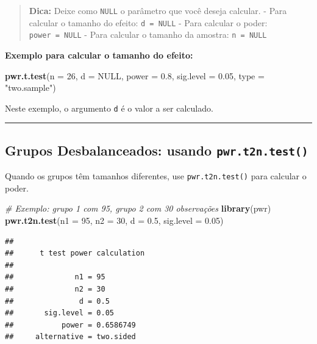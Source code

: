 \documentclass[
]{book}
\newenvironment{Shaded}{\begin{snugshade}}{\end{snugshade}}
\newcommand{\AttributeTok}[1]{\textcolor[rgb]{0.13,0.29,0.53}{#1}}
\newcommand{\CommentTok}[1]{\textcolor[rgb]{0.56,0.35,0.01}{\textit{#1}}}
\newcommand{\ConstantTok}[1]{\textcolor[rgb]{0.56,0.35,0.01}{#1}}
\newcommand{\DecValTok}[1]{\textcolor[rgb]{0.00,0.00,0.81}{#1}}
\newcommand{\FloatTok}[1]{\textcolor[rgb]{0.00,0.00,0.81}{#1}}
\newcommand{\FunctionTok}[1]{\textcolor[rgb]{0.13,0.29,0.53}{\textbf{#1}}}
\newcommand{\NormalTok}[1]{#1}
\newcommand{\StringTok}[1]{\textcolor[rgb]{0.31,0.60,0.02}{#1}}
\begin{document}
\begin{quote}
\textbf{Dica:} Deixe como \texttt{NULL} o parâmetro que você deseja calcular.
- Para calcular o tamanho do efeito: \texttt{d\ =\ NULL}
- Para calcular o poder: \texttt{power\ =\ NULL}
- Para calcular o tamanho da amostra: \texttt{n\ =\ NULL}
\end{quote}

\textbf{Exemplo para calcular o tamanho do efeito:}

\begin{Shaded}
\begin{Highlighting}[]
\FunctionTok{pwr.t.test}\NormalTok{(}\AttributeTok{n =} \DecValTok{26}\NormalTok{, }\AttributeTok{d =} \ConstantTok{NULL}\NormalTok{, }\AttributeTok{power =} \FloatTok{0.8}\NormalTok{, }\AttributeTok{sig.level =} \FloatTok{0.05}\NormalTok{, }\AttributeTok{type =} \StringTok{"two.sample"}\NormalTok{)}
\end{Highlighting}
\end{Shaded}

Neste exemplo, o argumento \texttt{d} é o valor a ser calculado.

\begin{center}\rule{0.5\linewidth}{0.5pt}\end{center}

\subsection{\texorpdfstring{Grupos Desbalanceados: usando \texttt{pwr.t2n.test()}}{Grupos Desbalanceados: usando pwr.t2n.test()}}\label{grupos-desbalanceados-usando-pwr.t2n.test}

Quando os grupos têm tamanhos diferentes, use \texttt{pwr.t2n.test()} para calcular o poder.

\begin{Shaded}
\begin{Highlighting}[]
\CommentTok{\# Exemplo: grupo 1 com 95, grupo 2 com 30 observações}
\FunctionTok{library}\NormalTok{(pwr)}
\FunctionTok{pwr.t2n.test}\NormalTok{(}\AttributeTok{n1 =} \DecValTok{95}\NormalTok{, }\AttributeTok{n2 =} \DecValTok{30}\NormalTok{, }\AttributeTok{d =} \FloatTok{0.5}\NormalTok{, }\AttributeTok{sig.level =} \FloatTok{0.05}\NormalTok{)}
\end{Highlighting}
\end{Shaded}

\begin{verbatim}
## 
##      t test power calculation 
## 
##              n1 = 95
##              n2 = 30
##               d = 0.5
##       sig.level = 0.05
##           power = 0.6586749
##     alternative = two.sided
\end{verbatim}
\end{document}

